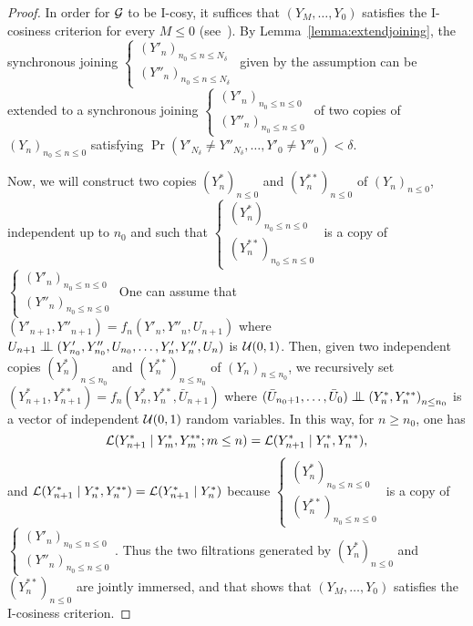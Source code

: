 \documentclass[12pt,a4paper]{article}
\begin{document}
\begin{proof}
In order for $\mathcal{G}$ to be I-cosy, it suffices that 
$(Y_M, \ldots, Y_0)$ satisfies the I-cosiness criterion 
for every $M \leq 0$  (see~\cite{LauXLIII}). 
By Lemma~\ref{lemma:extendjoining}, 
the synchronous joining $\left\{\begin{smallmatrix} {(Y'_n)}_{n_0 \leq n \leq N_\delta} \\ 
{(Y''_n)}_{n_0 \leq n \leq N_\delta}
\end{smallmatrix}\right.$ given by the assumption can be extended 
to a synchronous joining 
$\left\{\begin{smallmatrix} {(Y'_n)}_{n_0 \leq n \leq 0} \\ 
{(Y''_n)}_{n_0 \leq n \leq 0}
\end{smallmatrix}\right.$ of two copies of ${(Y_n)}_{n_0 \leq n \leq 0}$ 
satisfying 
$\Pr(Y'_{N_\delta} \neq Y''_{N_\delta}, \ldots, Y'_0 \neq Y''_0) < \delta$. 

Now, we will construct two copies ${(Y^*_n)}_{n \leq 0}$ and ${(Y^{**}_n)}_{n \leq 0}$ 
of ${(Y_n)}_{n \leq 0}$, independent up to $n_0$ and 
such that 
$\left\{\begin{smallmatrix} {(Y^*_n)}_{n_0 \leq n \leq 0} \\ 
{(Y^{**}_n)}_{n_0 \leq n \leq 0}
\end{smallmatrix}\right.$ is a copy of 
$\left\{\begin{smallmatrix} {(Y'_n)}_{n_0 \leq n \leq 0} \\ 
{(Y''_n)}_{n_0 \leq n \leq 0}
\end{smallmatrix}\right.$
One can assume that $(Y'_{n+1}, Y''_{n+1}) = f_n(Y'_n, Y''_n, U_{n+1})$ 
where $U_{n+1} \indep (Y'_{n_0}, Y''_{n_0}, U_{n_0}, \ldots, Y'_n, Y''_n, U_n)$ 
is $\mathcal{U}(0,1)$. 
Then, given two independent copies 
${(Y^*_n)}_{n \leq n_0}$ and ${(Y^{**}_n)}_{n \leq n_0}$ 
of ${(Y_n)}_{n \leq n_0}$, we recursively set  
$(Y^*_{n+1}, Y^{**}_{n+1}) = f_n(Y^*_n, Y^{**}_n, \bar U_{n+1})$ where 
$(\bar U_{n_0+1}, \ldots, \bar U_{0}) \indep {(Y^*_n, Y^{**}_n)}_{n \leq n_0}$ 
is a vector of independent $\mathcal{U}(0,1)$ random variables.   
In this way, 
for $n \geq n_0$, one has 
$$
\mathcal{L}(Y^*_{n+1} \mid Y^*_m, Y^{**}_m ; m \leq n) = 
\mathcal{L}(Y^*_{n+1} \mid Y^*_n, Y^{**}_n),
$$
and $\mathcal{L}(Y^*_{n+1} \mid Y^*_n, Y^{**}_n)=\mathcal{L}(Y^*_{n+1} \mid Y^*_n)$ 
because $\left\{\begin{smallmatrix} {(Y^*_n)}_{n_0 \leq n \leq 0} \\ 
{(Y^{**}_n)}_{n_0 \leq n \leq 0}
\end{smallmatrix}\right.$ is a copy of 
$\left\{\begin{smallmatrix} {(Y'_n)}_{n_0 \leq n \leq 0} \\ 
{(Y''_n)}_{n_0 \leq n \leq 0}
\end{smallmatrix}\right.$. 
Thus the two filtrations generated by ${(Y^*_n)}_{n \leq 0}$ and ${(Y^{**}_n)}_{n \leq 0}$ 
are jointly immersed, and that shows that $(Y_M, \ldots, Y_0)$ 
satisfies the I-cosiness criterion. 
\end{proof}
\end{document}
